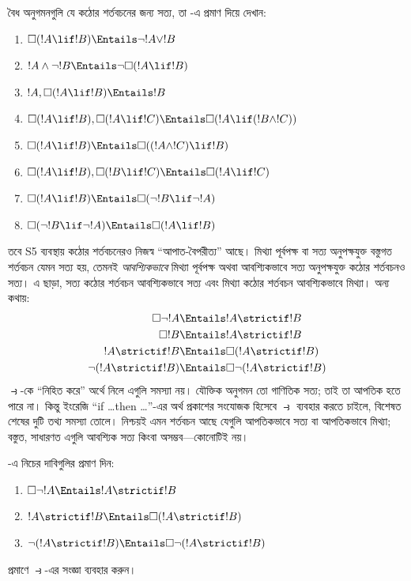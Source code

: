 \documentclass[../../../include/open-logic-section]{subfiles}
\begin{document}
\begin{prob}
  বৈধ অনুগমনগুলি যে কঠোর শর্তবচনের জন্য সত্য, তা
  -এ প্রমাণ দিয়ে দেখান:
  \begin{enumerate}
  \item $\Box(!A \lif !B) \Entails \lnot !A \lor !B$
  \item $!A \land \lnot !B \Entails \lnot\Box(!A \lif !B)$
  \item $!A, \Box(!A \lif !B) \Entails !B$
  \item $\Box(!A \lif !B), \Box(!A \lif !C) \Entails \Box(!A \lif (!B
    \land !C))$
  \item $\Box(!A \lif !B) \Entails \Box((!A \land !C) \lif !B)$
  \item $\Box(!A \lif !B), \Box(!B \lif !C) \Entails \Box(!A
    \lif !C)$
  \item $\Box(!A \lif !B) \Entails \Box(\lnot !B \lif \lnot !A)$
  \item $\Box(\lnot !B \lif \lnot !A) \Entails \Box(!A \lif !B)$
  \end{enumerate}
\end{prob}

তবে S5 ব্যবস্থায় কঠোর শর্তবচনেরও নিজস্ব ``আপাত-বৈপরীত্য'' আছে।
মিথ্যা পূর্বপক্ষ বা সত্য অনুপক্ষযুক্ত বস্তুগত শর্তবচন
যেমন সত্য হয়, তেমনই \emph{আবশ্যিকভাবে} মিথ্যা পূর্বপক্ষ
অথবা আবশ্যিকভাবে সত্য অনুপক্ষযুক্ত কঠোর শর্তবচনও সত্য।
এ ছাড়া, সত্য কঠোর শর্তবচন আবশ্যিকভাবে সত্য এবং মিথ্যা
কঠোর শর্তবচন আবশ্যিকভাবে মিথ্যা। অন্য কথায়:
\begin{align}
  \Box \lnot !A & \Entails !A \strictif !B\\
  \Box !B & \Entails !A \strictif !B\\
  !A \strictif !B& \Entails \Box(!A \strictif !B)\\
  \lnot(!A \strictif !B) & \Entails \Box\lnot(!A \strictif !B)
\end{align}
$\strictif$-কে ``নিহিত করে'' অর্থে নিলে এগুলি সমস্যা নয়।
যৌক্তিক অনুগমন তো গাণিতিক সত্য; তাই তা আপতিক হতে পারে না।
কিন্তু ইংরেজি ``if \dots then \dots''-এর অর্থ প্রকাশের
সংযোজক হিসেবে $\strictif$ ব্যবহার করতে চাইলে, বিশেষত
শেষের দুটি তথ্য সমস্যা তোলে। নিশ্চয়ই এমন শর্তবচন আছে
যেগুলি আপতিকভাবে সত্য বা আপতিকভাবে মিথ্যা; বস্তুত,
সাধারণত এগুলি আবশ্যিক সত্য কিংবা অসম্ভব—কোনোটিই নয়।

\begin{prob}
  -এ নিচের দাবিগুলির প্রমাণ দিন:
  \begin{enumerate}
    \item $\Box \lnot !A \Entails !A \strictif !B$
    \item $!A \strictif !B \Entails \Box(!A \strictif !B)$
    \item $\lnot(!A \strictif !B)  \Entails \Box\lnot(!A \strictif !B)$
  \end{enumerate}
  প্রমাণে $\strictif$-এর সংজ্ঞা ব্যবহার করুন।
\end{prob}
\end{document}
